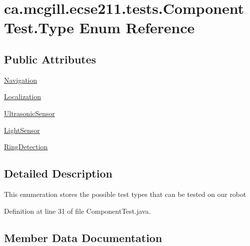 \hypertarget{enumca_1_1mcgill_1_1ecse211_1_1tests_1_1_component_test_1_1_type}{}\section{ca.\+mcgill.\+ecse211.\+tests.\+Component\+Test.\+Type Enum Reference}
\label{enumca_1_1mcgill_1_1ecse211_1_1tests_1_1_component_test_1_1_type}
\subsection*{Public Attributes}
\begin{DoxyCompactItemize}
\item 
\hyperlink{enumca_1_1mcgill_1_1ecse211_1_1tests_1_1_component_test_1_1_type_a70ec62ab2b745dd99e291459279910ea}{Navigation}
\item 
\hyperlink{enumca_1_1mcgill_1_1ecse211_1_1tests_1_1_component_test_1_1_type_acdc93de9366f2e6710c7f2fc0e4478c3}{Localization}
\item 
\hyperlink{enumca_1_1mcgill_1_1ecse211_1_1tests_1_1_component_test_1_1_type_acb88d74b8bd35b190f8b1b05730c213a}{Ultrasonic\+Sensor}
\item 
\hyperlink{enumca_1_1mcgill_1_1ecse211_1_1tests_1_1_component_test_1_1_type_aa8c9262ad5014cd52ecce2eec6604510}{Light\+Sensor}
\item 
\hyperlink{enumca_1_1mcgill_1_1ecse211_1_1tests_1_1_component_test_1_1_type_ab118eac94e0b37e6871a4c9a788c675e}{Ring\+Detection}
\end{DoxyCompactItemize}


\subsection{Detailed Description}
This enumeration stores the possible test types that can be tested on our robot 

Definition at line 31 of file Component\+Test.\+java.



\subsection{Member Data Documentation}
\mbox{\label{enumca_1_1mcgill_1_1ecse211_1_1tests_1_1_component_test_1_1_type_aa8c9262ad5014cd52ecce2eec6604510}} 
